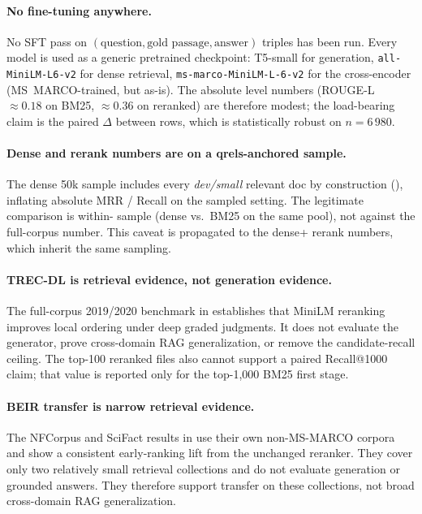 \documentclass[11pt,a4paper]{article}
\newcommand{\devsmall}{\textit{dev/small}}
\newcommand{\fdev}{6\,980}
\newcommand{\msmarco}{MS~MARCO}
\newcommand{\rougel}{ROUGE-L}
\newcommand{\bmtwofive}{BM25}
\begin{document}
\paragraph{No fine-tuning anywhere.}  No SFT pass on
$(\text{question}, \text{gold passage}, \text{answer})$ triples has
been run.  Every model is used as a generic pretrained checkpoint:
T5-small for generation, \texttt{all-MiniLM-L6-v2} for dense
retrieval, \texttt{ms-marco-MiniLM-L-6-v2} for the cross-encoder
(\msmarco{}-trained, but as-is).  The absolute level numbers
(\rougel{}~$\approx\!0.18$ on \bmtwofive{}, $\approx\!0.36$ on
reranked) are therefore modest; the load-bearing claim is the
paired $\Delta$ between rows, which is statistically robust on
$n\!=\!\fdev{}$.

\paragraph{Dense and rerank numbers are on a qrels-anchored sample.}  The dense
50k sample includes every \devsmall{} relevant doc by construction
(), inflating absolute MRR / Recall
on the sampled setting.  The legitimate comparison is within-
sample (dense vs.\ \bmtwofive{} on the same pool), not against the
full-corpus number.  This caveat is propagated to the dense+
rerank numbers, which inherit the same sampling.

\paragraph{TREC-DL is retrieval evidence, not generation evidence.}
The full-corpus 2019/2020 benchmark in
 establishes that MiniLM reranking improves
local ordering under deep graded judgments.  It does not evaluate the
generator, prove cross-domain RAG generalization, or remove the
candidate-recall ceiling.  The top-100 reranked files also cannot
support a paired Recall@1000 claim; that value is reported only for
the top-1,000 \bmtwofive{} first stage.

\paragraph{BEIR transfer is narrow retrieval evidence.}
The NFCorpus and SciFact results in  use their
own non-MS-MARCO corpora and show a consistent early-ranking lift from
the unchanged reranker.  They cover only two relatively small retrieval
collections and do not evaluate generation or grounded answers.  They
therefore support transfer on these collections, not broad cross-domain
RAG generalization.
\end{document}
